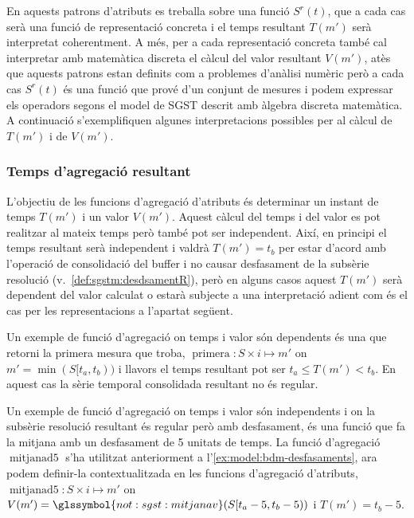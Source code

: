 En aquests patrons d'atributs es treballa sobre una funció $S^r(t)$,
que a cada cas serà una funció de representació concreta i el temps
resultant $T(m')$ serà interpretat coherentment.  A més, per a cada
representació concreta també cal interpretar amb matemàtica discreta
el càlcul del valor resultant $V(m')$, atès que aquests patrons estan
definits com a problemes d'anàlisi numèric però a cada cas $S^r(t)$ és
una funció que prové d'un conjunt de mesures i podem expressar els
operadors segons el model de \gls{SGST} descrit amb àlgebra discreta
matemàtica.  A continuació s'exemplifiquen algunes interpretacions
possibles per al càlcul de $T(m')$ i de $V(m')$.





\subsubsection{Temps d'agregació resultant}


L'objectiu de les funcions d'agregació d'atributs és determinar un
instant de temps $T(m')$ i un valor $V(m')$. Aquest càlcul del temps i
del valor es pot realitzar al mateix temps però també pot ser
independent. Així, en principi el temps resultant serà independent i
valdrà $T(m')=t_b$ per estar d'acord amb l'operació de consolidació
del buffer i no causar desfasament de la subsèrie resolució
(v.~\autoref{def:sgstm:desdsamentR}), però en alguns casos aquest
$T(m')$ serà dependent del valor calculat o estarà subjecte a una
interpretació adient com és el cas per les representacions a l'apartat
següent.


Un exemple de funció d'agregació on temps i valor són dependents és
una que retorni la primera mesura que troba, $\operatorname{primera}:
S \times i \mapsto m'$ on $m' = \min(S[t_a,t_b))$ i llavors el temps
resultant pot ser $t_a \leq T(m') < t_b$. En aquest cas la sèrie
temporal consolidada resultant no és regular.


Un exemple de funció d'agregació on temps i valor són independents i
on la subsèrie resolució resultant és regular però amb desfasament, és
una funció que fa la mitjana amb un desfasament de 5 unitats de temps.
La funció d'agregació $\operatorname{mitjanad5}$ s'ha utilitzat
anteriorment a l'\autoref{ex:model:bdm-desfasaments}, ara podem
definir-la contextualitzada en les funcions d'agregació d'atributs,
$\operatorname{mitjanad5}: S \times i \mapsto m'$ on $V(m')=
\glssymbol{not:sgst:mitjanav}(S[t_a-5,t_b-5))$ i $T(m')=t_b-5$.

